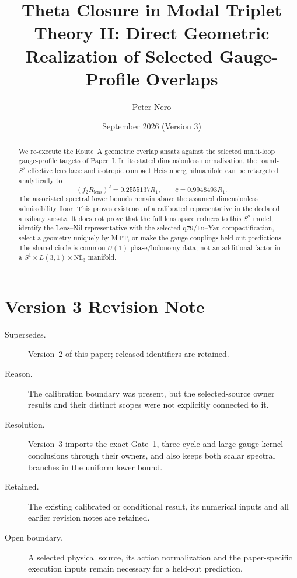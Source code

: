 \documentclass[11pt]{article}
\title{Theta Closure in Modal Triplet Theory II:
Direct Geometric Realization of Selected Gauge-Profile Overlaps}
\author{Peter Nero}
\date{September 2026 (Version 3)}
\begin{document}
\maketitle

\begin{abstract}
We re-execute the Route~A geometric overlap ansatz against the selected
multi-loop gauge-profile targets of Paper~I.  In its stated dimensionless
normalization, the round-$S^2$ effective lens base and isotropic compact
Heisenberg nilmanifold can be retargeted analytically to
\[
 (f_2R_{\mathrm{lens}})^2=0.2555137R_1,
 \qquad c=0.9948493R_1.
\]
The associated spectral lower bounds remain above the assumed dimensionless
admissibility floor. This proves existence of a calibrated representative in
the declared auxiliary ansatz. It does not prove that the full lens space
reduces to this $S^2$ model, identify the Lens--Nil representative with the
selected q79/Fu--Yau compactification, select a geometry uniquely by MTT, or
make the gauge couplings held-out predictions. The shared circle is common
$U(1)$ phase/holonomy data, not an additional factor in a
$S^1\times L(3,1)\times\mathrm{Nil}_3$ manifold.
\end{abstract}

\section*{Version 3 Revision Note}
\label{sec:revision-v3}
\begin{description}
\item[Supersedes.] Version~2 of this paper; released identifiers are retained.
\item[Reason.] The calibration boundary was present, but the selected-source
owner results and their distinct scopes were not explicitly connected to it.
\item[Resolution.] Version~3 imports the exact Gate~1, three-cycle and
large-gauge-kernel conclusions through their owners, and also keeps both scalar spectral branches in the uniform lower bound.
\item[Retained.] The existing calibrated or conditional result, its numerical
inputs and all earlier revision notes are retained.
\item[Open boundary.] A selected physical source, its action normalization and
the paper-specific execution inputs remain necessary for a held-out prediction.
\end{description}
\end{document}
